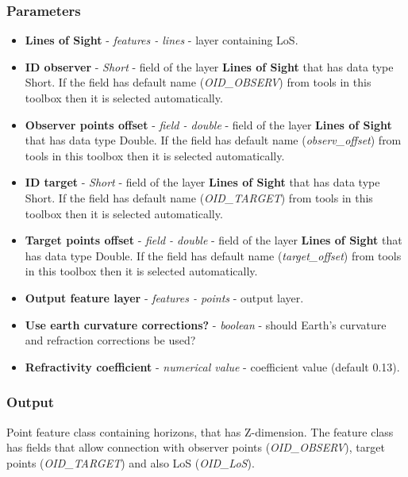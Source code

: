 \documentclass[]{article}
\begin{document}
\subsubsection{Parameters}
\begin{itemize}
	\item \textbf{Lines of Sight} - \textit{features - lines} - layer containing LoS.
	\item \textbf{ID observer} - \textit{Short} - field of the layer \textbf{Lines of Sight} that has data type Short. If the field has default name (\textit{OID\_OBSERV}) from tools in this toolbox then it is selected automatically.
	\item \textbf{Observer points offset} - \textit{field - double} - field of the layer \textbf{Lines of Sight} that has data type Double. If the field has default name (\textit{observ\_offset}) from tools in this toolbox then it is selected automatically.
	\item \textbf{ID target} - \textit{Short} - field of the layer \textbf{Lines of Sight} that has data type Short. If the field has default name (\textit{OID\_TARGET}) from tools in this toolbox then it is selected automatically.
	\item \textbf{Target points offset} - \textit{field - double} - field of the layer \textbf{Lines of Sight} that has data type Double. If the field has default name (\textit{target\_offset}) from tools in this toolbox then it is selected automatically.
	\item \textbf{Output feature layer} - \textit{features - points} - output layer.
	\item \textbf{Use earth curvature corrections?} - \textit{boolean} - should Earth's curvature and refraction corrections be used?
	\item \textbf{Refractivity coefficient} - \textit{numerical value}  - coefficient value (default 0.13).
\end{itemize}

\subsubsection{Output}

Point feature class containing horizons, that has Z-dimension. The feature class has fields that allow connection with observer points (\textit{OID\_OBSERV}), target points (\textit{OID\_TARGET}) and also LoS (\textit{OID\_LoS}). 
\end{document}
